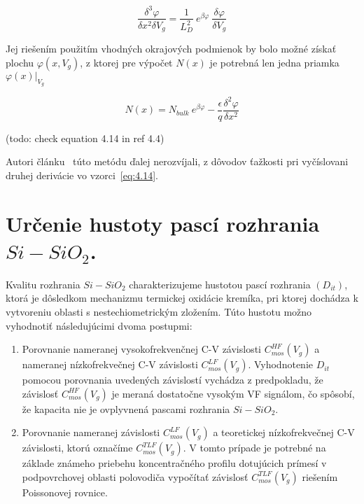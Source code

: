 \begin{equation}\label{eq:4.13}
  \frac{\delta^{3}\varphi}{\delta x^{2}\delta V_{g}} = {\frac{1}{L_{D}^{2}}}\ {e^{\beta\varphi}}\ {\frac{\delta\varphi}{\delta V_{g}}}
\end{equation}

Jej riešením použitím vhodných okrajových podmienok by bolo možné
získať plochu $\varphi(x,V_{g})$, z ktorej pre výpočet $N(x)$ je
potrebná len jedna priamka $\varphi(x)\rvert_{V_{g}}$

\begin{equation}\label{eq:4.14}
  N(x) = N_{bulk}\ e^{\beta\varphi}-\frac{\epsilon}{q}\frac{\delta^{2}\varphi}{\delta x^{2}}
\end{equation}

(todo: check equation 4.14 in ref 4.4)

Autori článku~\cite{4.4} túto metódu ďalej nerozvíjali, z dôvodov
ťažkosti pri vyčíslovani druhej derivácie vo vzorci~\ref{eq:4.14}.


\section{Určenie hustoty pascí rozhrania $Si-SiO_{2}$.}\label{sec:4.2}

Kvalitu rozhrania $Si-SiO_{2}$ charakterizujeme hustotou pascí
rozhrania $(D_{it})$, ktorá je dôsledkom mechanizmu termickej oxidácie
kremíka, pri ktorej dochádza k vytvoreniu oblasti s nestechiometrickým
zložením. Túto hustotu možno vyhodnotiť následujúcimi dvoma postupmi:

\begin{enumerate}
\item Porovnanie nameranej vysokofrekvenčnej C-V závislosti
  $C_{mos}^{HF}(V_{g})$ a nameranej nízkofrekvečnej C-V závislosti
  $C_{mos}^{LF}(V_{g})$. Vyhodnotenie $D_{it}$ pomocou porovnania
  uvedených závislostí vychádza z predpokladu, že závislosť
  $C_{mos}^{HF}(V_{g})$ je meraná dostatočne vysokým VF signálom, čo
  spôsobí, že kapacita nie je ovplyvnená pascami rozhrania
  $Si-SiO_{2}$.
\item Porovnanie nameranej závislosti $C_{mos}^{LF}(V_{g})$ a
  teoretickej nízkofrekvečnej C-V závislosti, ktorú označíme
  $C_{mos}^{TLF}(V_{g})$.  V tomto prípade je potrebné na základe
  známeho priebehu koncentračného profilu dotujúcich prímesí v
  podpovrchovej oblasti polovodiča vypočítať závislosť
  $C_{mos}^{TLF}(V_{g})$ riešením Poissonovej rovnice.
\end{enumerate}

